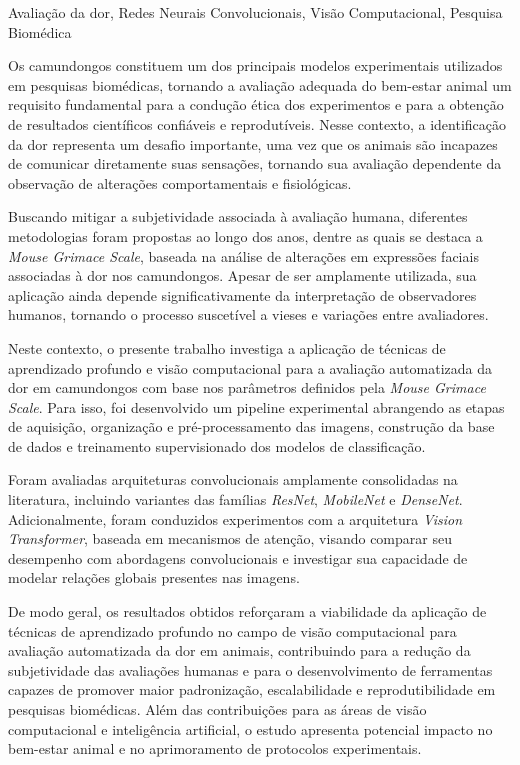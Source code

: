 \documentclass[dissertmst]{ppgco}
\begin{document}
\begin{resumo}{Avaliação da dor, Redes Neurais Convolucionais, Visão Computacional, Pesquisa Biomédica}


    Os camundongos constituem um dos principais modelos experimentais utilizados em pesquisas biomédicas, tornando a avaliação adequada do bem-estar animal um requisito fundamental para a condução ética dos experimentos e para a obtenção de resultados científicos confiáveis e reprodutíveis. Nesse contexto, a identificação da dor representa um desafio importante, uma vez que os animais são incapazes de comunicar diretamente suas sensações, tornando sua avaliação dependente da observação de alterações comportamentais e fisiológicas.

    Buscando mitigar a subjetividade associada à avaliação humana, diferentes metodologias foram propostas ao longo dos anos, dentre as quais se destaca a \textit{Mouse Grimace Scale}, baseada na análise de alterações em expressões faciais associadas à dor nos camundongos. Apesar de ser amplamente utilizada, sua aplicação ainda depende significativamente da interpretação de observadores humanos, tornando o processo suscetível a vieses e variações entre avaliadores.
    
    Neste contexto, o presente trabalho investiga a aplicação de técnicas de aprendizado profundo e visão computacional para a avaliação automatizada da dor em camundongos com base nos parâmetros definidos pela \textit{Mouse Grimace Scale}. Para isso, foi desenvolvido um pipeline experimental abrangendo as etapas de aquisição, organização e pré-processamento das imagens, construção da base de dados e treinamento supervisionado dos modelos de classificação.
    
    Foram avaliadas arquiteturas convolucionais amplamente consolidadas na literatura, incluindo variantes das famílias \textit{ResNet}, \textit{MobileNet} e \textit{DenseNet}. Adicionalmente, foram conduzidos experimentos com a arquitetura \textit{Vision Transformer}, baseada em mecanismos de atenção, visando comparar seu desempenho com abordagens convolucionais e investigar sua capacidade de modelar relações globais presentes nas imagens. 
    
    De modo geral, os resultados obtidos reforçaram a viabilidade da aplicação de técnicas de aprendizado profundo no campo de visão computacional para avaliação automatizada da dor em animais, contribuindo para a redução da subjetividade das avaliações humanas e para o desenvolvimento de ferramentas capazes de promover maior padronização, escalabilidade e reprodutibilidade em pesquisas biomédicas. Além das contribuições para as áreas de visão computacional e inteligência artificial, o estudo apresenta potencial impacto no bem-estar animal e no aprimoramento de protocolos experimentais.
 

\end{resumo}
\end{document}
